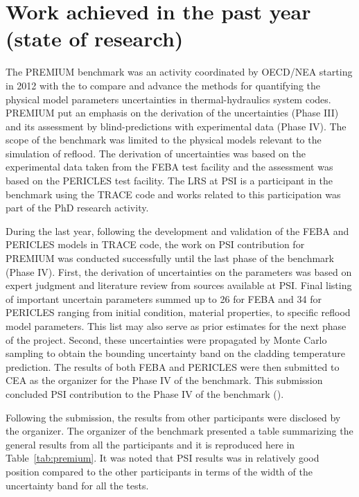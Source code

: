 \documentclass[11pt,titlepage]{article}
\begin{document}
\section{Work achieved in the past year (state of research)}


The PREMIUM benchmark was an activity coordinated by OECD/NEA starting in 2012 
with the to compare and advance the methods for quantifying the physical 
model parameters uncertainties in thermal-hydraulics system codes.
PREMIUM put an emphasis on the derivation of the uncertainties (Phase III) and 
its assessment by blind-predictions with experimental data (Phase IV).
The scope of the benchmark was limited to the physical models relevant to the 
simulation of reflood.
The derivation of uncertainties was based on the experimental data taken from 
the FEBA test facility and the assessment was based on the PERICLES test 
facility.
The LRS at PSI is a participant in the benchmark using the TRACE code and 
works related to this participation was part of the PhD research activity.

During the last year, following the development and validation of the FEBA 
and PERICLES models in TRACE code, the work on PSI contribution for 
PREMIUM was conducted successfully until the last phase of the benchmark 
(Phase IV).
First, the derivation of uncertainties on the parameters was based on expert 
judgment and literature review from sources available at PSI.
Final listing of important uncertain parameters summed up to 26 for FEBA and 
34 for PERICLES ranging from initial condition, material properties, to 
specific reflood model parameters.
This list may also serve as prior estimates for the next phase of the project.
Second, these uncertainties were propagated by Monte Carlo sampling to obtain
the bounding uncertainty band on the cladding temperature prediction.
The results of both FEBA and PERICLES were then submitted to CEA as the 
organizer for the Phase IV of the benchmark. 
This submission concluded PSI contribution to the Phase IV of the benchmark 
(\cite{Wicaksono2014a, Wicaksono2014c}).

Following the submission, the results from other participants were disclosed by
the organizer.
The organizer of the benchmark presented a table summarizing the general 
results from all the participants and it is reproduced here in 
Table~\ref{tab:premium}.
It was noted that PSI results was in relatively good position compared to the
other participants in terms of the width of the uncertainty band for all the 
tests.
\end{document}
